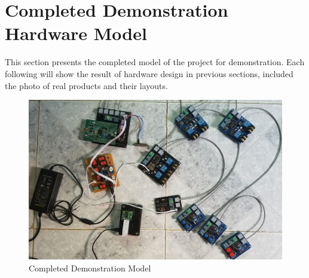 \section{Completed Demonstration Hardware Model}
This section presents the completed model of the project for demonstration. Each following will show the result of hardware design in previous sections, included the photo of real products and their layouts.
\begin{figure}[!htb]
    \begin{center}
    \includegraphics[scale=0.12]{images/overall.jpg}
    \caption{Completed Demonstration Model}
    \label{fig:completeDemo}
    \end{center}
\end{figure}

